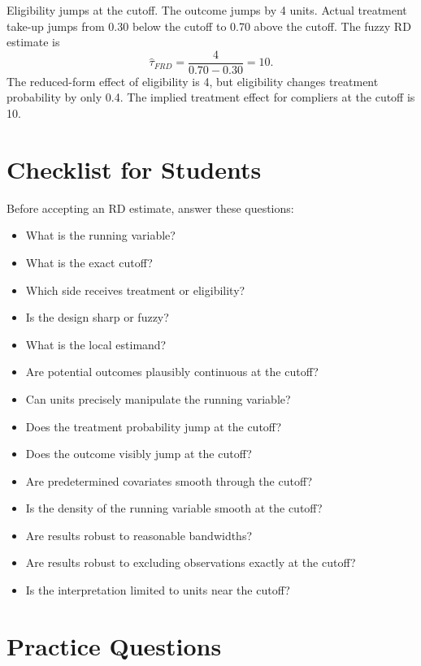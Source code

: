 \begin{exmp}
Eligibility jumps at the cutoff. The outcome jumps by 4 units. Actual treatment take-up jumps from 0.30 below the cutoff to 0.70 above the cutoff. The fuzzy RD estimate is
\[
    \hat{\tau}_{FRD}=\frac{4}{0.70-0.30}=10.
\]
The reduced-form effect of eligibility is 4, but eligibility changes treatment probability by only 0.4. The implied treatment effect for compliers at the cutoff is 10.
\end{exmp}

\section{Checklist for Students}

Before accepting an RD estimate, answer these questions:
\begin{itemize}
    \item What is the running variable?
    \item What is the exact cutoff?
    \item Which side receives treatment or eligibility?
    \item Is the design sharp or fuzzy?
    \item What is the local estimand?
    \item Are potential outcomes plausibly continuous at the cutoff?
    \item Can units precisely manipulate the running variable?
    \item Does the treatment probability jump at the cutoff?
    \item Does the outcome visibly jump at the cutoff?
    \item Are predetermined covariates smooth through the cutoff?
    \item Is the density of the running variable smooth at the cutoff?
    \item Are results robust to reasonable bandwidths?
    \item Are results robust to excluding observations exactly at the cutoff?
    \item Is the interpretation limited to units near the cutoff?
\end{itemize}

\section{Practice Questions}

